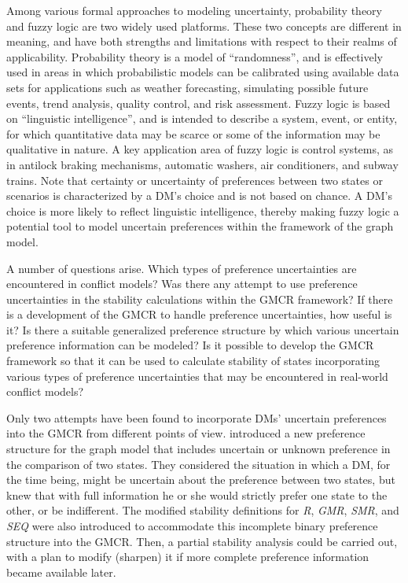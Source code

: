 Among various formal approaches to modeling uncertainty, probability theory \citep{Feller1968, Feller1971} and fuzzy logic \citep{Zadeh1965, Zadeh1973} are two widely used platforms. These two concepts are different in meaning, and have both strengths and limitations with respect to their realms of applicability. Probability theory is a model of ``randomness”, and is effectively used in areas in which probabilistic models can be calibrated using available data sets for applications such as weather forecasting, simulating possible future events, trend analysis, quality control, and risk assessment. Fuzzy logic is based on ``linguistic intelligence”, and is intended to describe a system, event, or entity, for which quantitative data may be scarce or some of the information may be qualitative in nature. A key application area of fuzzy logic is control systems, as in antilock braking mechanisms, automatic washers, air conditioners, and subway trains. Note that certainty or uncertainty of preferences between two states or scenarios is characterized by a DM's choice and is not based on chance. A DM's choice is more likely to reflect linguistic intelligence, thereby making fuzzy logic a potential tool to model uncertain preferences within the framework of the graph model.

A number of questions arise. Which types of preference uncertainties are encountered in conflict models? Was there any attempt to use preference uncertainties in the stability calculations within the GMCR framework? If there is a development of the GMCR to handle preference uncertainties, how useful is it? Is there a suitable generalized preference structure by which various uncertain preference information can be modeled? Is it possible to develop the GMCR framework so that it can be used to calculate stability of states incorporating various types of preference uncertainties that may be encountered in real-world conflict models?

Only two attempts have been found to incorporate DMs' uncertain preferences into the GMCR from different points of view. \citet{Li-et-al2004a} introduced a new preference structure for the graph model that includes uncertain or unknown preference in the comparison of two states. They considered the situation in which a DM, for the time being, might be uncertain about the preference between two states, but knew that with full information he or she would strictly prefer one state to the other, or be indifferent. The modified stability definitions for \emph{R}, \emph{GMR}, \emph{SMR}, and \emph{SEQ} were also introduced to accommodate this incomplete binary preference structure into the GMCR. Then, a partial stability analysis could be carried out, with a plan to modify (sharpen) it if more complete preference information became available later.

